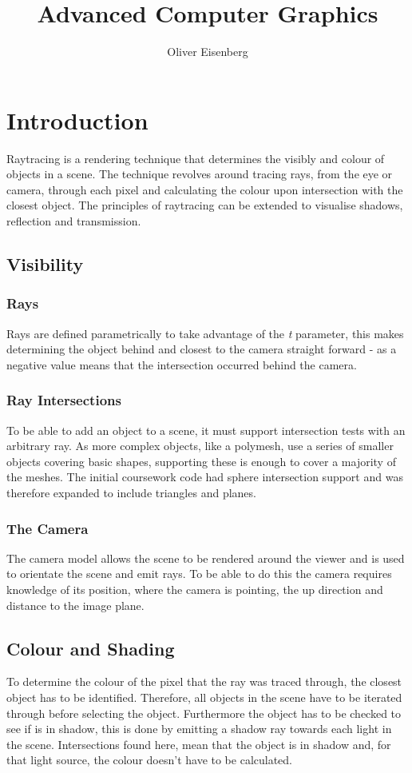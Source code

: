 \documentclass{article}
\begin{document}
\title{Advanced Computer Graphics}
\author{Oliver Eisenberg}
\maketitle
\tableofcontents

\section{Introduction}
Raytracing is a rendering technique that determines the visibly and colour of objects in a scene. The technique revolves around tracing rays, from the eye or camera, through each pixel and calculating the colour upon intersection with the closest object. The principles of raytracing can be extended to visualise shadows, reflection and transmission. 

\subsection{Visibility}
\subsubsection{Rays}
Rays are defined parametrically to take advantage of the \textit{t} parameter, this makes determining the object behind and closest to the camera straight forward - as a negative value means that the intersection occurred behind the camera.

\subsubsection{Ray Intersections}
To be able to add an object to a scene, it must support intersection tests with an arbitrary ray. As more complex objects, like a polymesh, use a series of smaller objects covering basic shapes, supporting these is enough to cover a majority of the meshes. The initial coursework code had sphere intersection support and was therefore expanded to include triangles and planes.
\subsubsection{The Camera}
The camera model allows the scene to be rendered around the viewer and is used to orientate the scene and emit rays. To be able to do this the camera requires knowledge of its position, where the camera is pointing, the up direction and distance to the image plane.
\subsection{Colour and Shading}
To determine the colour of the pixel that the ray was traced through, the closest object has to be identified. Therefore, all objects in the scene have to be iterated through before selecting the object. Furthermore the object has to be checked to see if is in shadow, this is done by emitting a shadow ray towards each light in the scene. Intersections found here, mean that the object is in shadow and, for that light source, the colour doesn't have to be calculated. 
\end{document}

